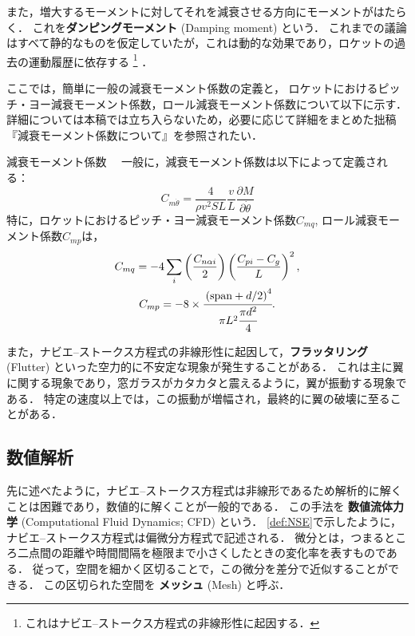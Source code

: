 \documentclass[uplatex,dvipdfmx,a4j,11pt]{jsreport}
\newcommand{\keyword}[1]{\textcolor{mainblue}{\textbf{#1}}}
\numberwithin{equation}{chapter}
\begin{document}
\enskip

また，増大するモーメントに対してそれを減衰させる方向にモーメントがはたらく．
これを\keyword{ダンピングモーメント} (Damping moment) という．
これまでの議論はすべて静的なものを仮定していたが，これは動的な効果であり，ロケットの過去の運動履歴に依存する
\footnote{これはナビエ--ストークス方程式の非線形性に起因する．} ．

ここでは，簡単に一般の減衰モーメント係数の定義と，
ロケットにおけるピッチ・ヨー減衰モーメント係数，ロール減衰モーメント係数について以下に示す．
詳細については本稿では立ち入らないため，必要に応じて詳細をまとめた拙稿『減衰モーメント係数について』を参照されたい．
\begin{definition}{減衰モーメント係数}{}{}
  　一般に，減衰モーメント係数は以下によって定義される：
  \begin{equation}
  C_{m\dot{\theta}} = \frac{4}{\rho v^2 S L}\frac{v}{L}\frac{\partial M}{\partial\dot{\theta}} \label{fte_def}
\end{equation}
特に，ロケットにおけるピッチ・ヨー減衰モーメント係数$C_{mq}$, ロール減衰モーメント係数$C_{mp}$は，
\begin{gather}
  C_{mq} = - 4 \sum_i \left(\frac{C_{n\alpha i}}{2}\right)\left(\frac{C_{pi} - C_{g}}{L}\right)^2,\\
  C_{mp} = - 8 \times \cfrac{\left(\mathrm{span} + d/2\right)^4}{\pi L^2 \cfrac{\pi d^2}{4}}.
\end{gather}
\end{definition}

\enskip

また，ナビエ--ストークス方程式の非線形性に起因して，\keyword{フラッタリング} (Flutter) といった空力的に不安定な現象が発生することがある．
これは主に翼に関する現象であり，窓ガラスがカタカタと震えるように，翼が振動する現象である．
特定の速度以上では，この振動が増幅され，最終的に翼の破壊に至ることがある．

\subsection{数値解析}
先に述べたように，ナビエ--ストークス方程式は非線形であるため解析的に解くことは困難であり，数値的に解くことが一般的である．
この手法を \keyword{数値流体力学} (Computational Fluid Dynamics; CFD) という．
\cref{def:NSE}で示したように，ナビエ--ストークス方程式は偏微分方程式で記述される．
微分とは，つまるところ二点間の距離や時間間隔を極限まで小さくしたときの変化率を表すものである．
従って，空間を細かく区切ることで，この微分を差分で近似することができる．
この区切られた空間を \keyword{メッシュ} (Mesh) と呼ぶ．
\end{document}

